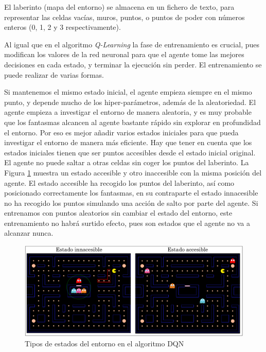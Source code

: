 		
		El laberinto (mapa del entorno) se almacena en un fichero de texto, para representar las celdas vacías, muros, puntos, o puntos de poder con números enteros (0, 1, 2 y 3 respectivamente).
		
		
		Al igual que en el algoritmo \textit{Q-Learning} la fase de entrenamiento es crucial, pues modifican los valores de la red neuronal para que el agente tome las mejores decisiones en cada estado, y terminar la ejecución sin perder. El entrenamiento se puede realizar de varias formas.	
			
							
		Si mantenemos el mismo estado inicial, el agente empieza siempre en el mismo punto, y depende mucho de los hiper-parámetros, además de la aleatoriedad. El agente empieza a investigar el entorno de manera aleatoria, y es muy probable que los fantasmas alcancen al agente bastante rápido sin explorar en profundidad el entorno. Por eso es mejor añadir varios estados iniciales para que pueda investigar el entorno de manera más eficiente. Hay que tener en cuenta que los estados iniciales tienen que ser puntos accesibles desde el estado inicial original. El agente no puede saltar a otras celdas sin coger los puntos del laberinto. La Figura \ref{fig:pacman_states} muestra un estado accesible y otro inaccesible con la misma posición del agente. El estado accesible ha recogido los puntos del laberinto, así como posicionado correctamente los fantasmas, en su contraparte el estado innacesible no ha recogido los puntos simulando una acción de salto por parte del agente. Si entrenamos con puntos aleatorios sin cambiar el estado del entorno, este entrenamiento no habrá surtido efecto, pues son estados que el agente no va a alcanzar nunca.
			
		
		\begin{figure}[!h]
			\centering
			\includegraphics[width=1\textwidth]{images/chapter_3/pacman_states}	
			\caption{Tipos de estados del entorno en el algoritmo DQN}
			\label{fig:pacman_states}
		\end{figure}
		
